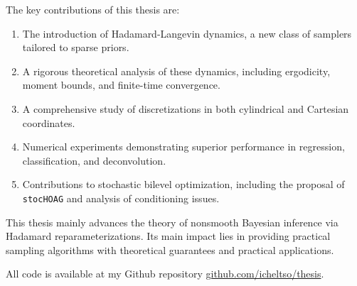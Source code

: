 \documentclass[11pt, twoside]{report}
\begin{document}
The key contributions of this thesis are:
\begin{enumerate}
    \item The introduction of Hadamard-Langevin dynamics, a new class of samplers tailored to sparse priors.
    \item A rigorous theoretical analysis of these dynamics, including ergodicity, moment bounds, and finite-time convergence.
    \item A comprehensive study of discretizations in both cylindrical and Cartesian coordinates.
    \item Numerical experiments demonstrating superior performance in regression, classification, and deconvolution.
    \item Contributions to stochastic bilevel optimization, including the proposal of \texttt{stocHOAG} and analysis of conditioning issues.
\end{enumerate}

This thesis mainly advances the theory of nonsmooth Bayesian inference via Hadamard reparameterizations. Its main impact lies in providing practical sampling algorithms with theoretical guarantees and practical applications.

All code is available at my Github repository \href{https://github.com/icheltso/thesis}{github.com/icheltso/thesis}.
\end{document}
